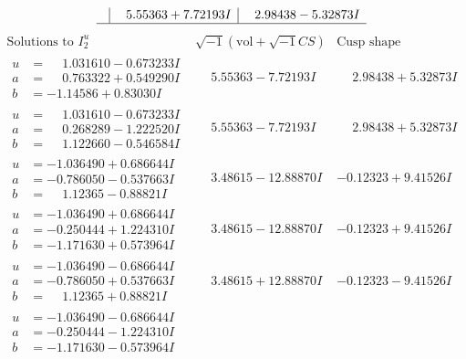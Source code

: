 \documentclass[1p]{elsarticle_modified}
\theoremstyle{definition}
\newcommand{\I}{\sqrt{-1}}
\begin{document}
$$\begin{array}{c|c|c}
 & \phantom{-}5.55363 + 7.72193 I & \phantom{-}2.98438 - 5.32873 I\\
 \hline 
 \end{array}$$\newpage$$\begin{array}{c|c|c}  
\text{Solutions to }I^u_{2}& \I (\text{vol} + \sqrt{-1}CS) & \text{Cusp shape}\\
 \hline 
\begin{aligned}
u &= \phantom{-}1.031610 - 0.673233 I \\
a &= \phantom{-}0.763322 + 0.549290 I \\
b &= -1.14586 + 0.83030 I\end{aligned}
 & \phantom{-}5.55363 - 7.72193 I & \phantom{-}2.98438 + 5.32873 I \\ \hline\begin{aligned}
u &= \phantom{-}1.031610 - 0.673233 I \\
a &= \phantom{-}0.268289 - 1.222520 I \\
b &= \phantom{-}1.122660 - 0.546584 I\end{aligned}
 & \phantom{-}5.55363 - 7.72193 I & \phantom{-}2.98438 + 5.32873 I \\ \hline\begin{aligned}
u &= -1.036490 + 0.686644 I \\
a &= -0.786050 - 0.537663 I \\
b &= \phantom{-}1.12365 - 0.88821 I\end{aligned}
 & \phantom{-}3.48615 - 12.88870 I & -0.12323 + 9.41526 I \\ \hline\begin{aligned}
u &= -1.036490 + 0.686644 I \\
a &= -0.250444 + 1.224310 I \\
b &= -1.171630 + 0.573964 I\end{aligned}
 & \phantom{-}3.48615 - 12.88870 I & -0.12323 + 9.41526 I \\ \hline\begin{aligned}
u &= -1.036490 - 0.686644 I \\
a &= -0.786050 + 0.537663 I \\
b &= \phantom{-}1.12365 + 0.88821 I\end{aligned}
 & \phantom{-}3.48615 + 12.88870 I & -0.12323 - 9.41526 I \\ \hline\begin{aligned}
u &= -1.036490 - 0.686644 I \\
a &= -0.250444 - 1.224310 I \\
b &= -1.171630 - 0.573964 I\end{aligned}

\end{array}$$
\end{document}
